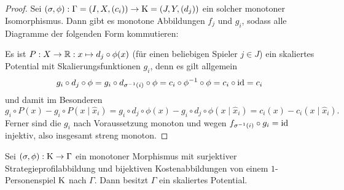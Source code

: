 \begin{proof}
	Sei $(\sigma, \phi): \Gamma =(I, X, (c_i)) \to \mathrm{K} = (J, Y, (d_j))$ ein solcher monotoner Isomorphismus. Dann gibt es monotone Abbildungen $f_j$ und $g_i$, sodass alle Diagramme der folgenden Form kommutieren:
	\begin{center}
	\end{center}
	Es ist $P: X \to \mathbb{R}: x \mapsto d_j \circ \phi(x)$ (für einen beliebigen Spieler $j \in J$) ein skaliertes Potential mit Skalierungsfunktionen $g_i$, denn es gilt allgemein
		\[g_i \circ d_j \circ \phi = g_i \circ d_{\sigma^{-1}(i)} \circ \phi = c_i \circ \phi^{-1} \circ \phi = c_i \circ \mathrm{id} = c_i \]
	und damit im Besonderen
		\[g_i \circ P(x) - g_i \circ P(x \mid \hat{x}_i) = g_i \circ d_j \circ \phi(x) - g_i \circ d_j \circ \phi(x \mid \hat{x}_i) = c_i(x) - c_i(x \mid \hat{x}_i) .\]
	Ferner sind die $g_i$ nach Voraussetzung monoton und wegen $f_{\sigma^{-1}(i)} \circ g_i = \mathrm{id}$ injektiv, also insgesamt streng monoton.
\end{proof}

\begin{kor}\label{kor:skalPotWennMon1PerMorph}
	Sei $(\sigma, \phi): \mathrm{K} \to \Gamma$ ein monotoner Morphismus mit surjektiver Strategieprofilabbildung und bijektiven Kostenabbildungen von einem $1$-Personenspiel $\mathrm{K}$ nach $\Gamma$. Dann besitzt $\Gamma$ ein skaliertes Potential.
\end{kor}

